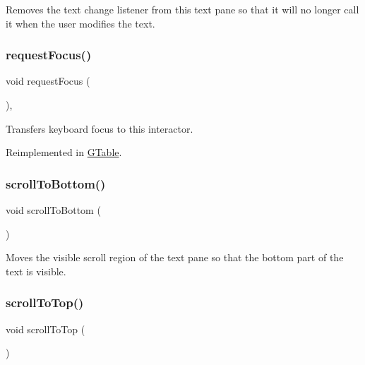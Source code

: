 Removes the text change listener from this text pane so that it will no longer call it when the user modifies the text. 

\mbox{\label{classGInteractor_a519fb2ac767f8b2febbb50b898b8c8cb}} 
\subsubsection{\texorpdfstring{request\+Focus()}{requestFocus()}}
{\footnotesize\ttfamily void request\+Focus (\begin{DoxyParamCaption}{ }\end{DoxyParamCaption})\hspace{0.3cm}{\ttfamily [virtual]}, {\ttfamily [inherited]}}



Transfers keyboard focus to this interactor. 



Reimplemented in \mbox{\hyperlink{classGTable_a49b39e0eeaf5af829e8956e9055c5cdc}{G\+Table}}.

\mbox{\label{classGBrowserPane_ad4c9b6140b529865a6cdeed37a339237}} 
\subsubsection{\texorpdfstring{scroll\+To\+Bottom()}{scrollToBottom()}}
{\footnotesize\ttfamily void scroll\+To\+Bottom (\begin{DoxyParamCaption}{ }\end{DoxyParamCaption})\hspace{0.3cm}{\ttfamily [virtual]}}



Moves the visible scroll region of the text pane so that the bottom part of the text is visible. 

\mbox{\label{classGBrowserPane_a9eacfcf7c186936ed957dd1c8a9c6b64}} 
\subsubsection{\texorpdfstring{scroll\+To\+Top()}{scrollToTop()}}
{\footnotesize\ttfamily void scroll\+To\+Top (\begin{DoxyParamCaption}{ }\end{DoxyParamCaption})\hspace{0.3cm}{\ttfamily [virtual]}}



